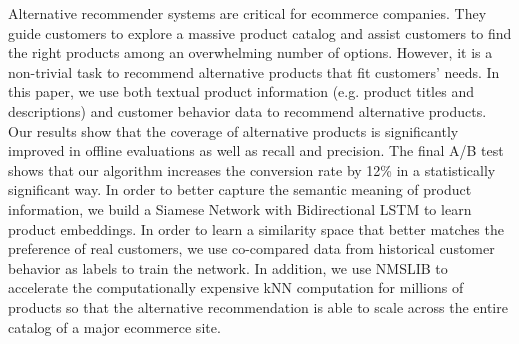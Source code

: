 Alternative recommender systems are critical for ecommerce companies. They guide customers to explore a massive product catalog and assist customers to find the right products among an overwhelming number of options. However, it is a non-trivial task to recommend alternative products that fit customers' needs. In this paper, we use both textual product information (e.g. product titles and descriptions) and customer behavior data to recommend alternative products. Our results show that the coverage of alternative products is significantly improved in offline evaluations as well as recall and precision. The final A/B test shows that our algorithm increases the conversion rate by 12\% in a statistically significant way. In order to better capture the semantic meaning of product information, we build a Siamese Network with Bidirectional LSTM to learn product embeddings. In order to learn a similarity space that better matches the preference of real customers, we use co-compared data from historical customer behavior as labels to train the network. In addition, we use NMSLIB to accelerate the computationally expensive kNN computation for millions of products so that the alternative recommendation is able to scale across the entire catalog of a major ecommerce site.
